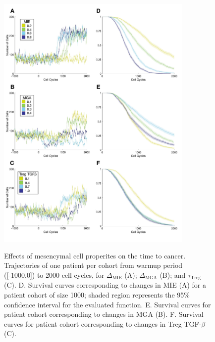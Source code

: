\documentclass[11pt]{article}
\begin{document}
\begin{figure}
\center
{\includegraphics[width=0.85\textwidth]{Figure3/Figure3.pdf}}
\caption{Effects of mesencymal cell properites on the time to cancer. Trajectories of one patient per cohort from warmup period ([-1000,0]) to 2000 cell cycles, for $\Delta_\text{MIE}$ (A); $\Delta_\text{MGA}$ (B); and $\tau_\text{Treg}$ (C). 
D. Survival curves corresponding to changes in MIE (A) for a patient cohort of size 1000; shaded region represents the 95\% confidence interval for the evaluated function. 
E. Survival curves for patient cohort corresponding to changes in MGA (B).
F. Survival curves for patient cohort corresponding to changes in Treg TGF-$\beta$ (C). 
}
\label{fig:FirstSurvivalCurves}
\end{figure}
\end{document}
